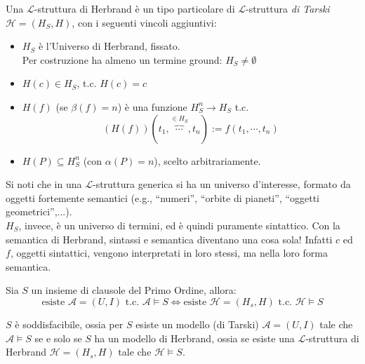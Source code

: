\begin{defi}
  Una $\mathscr{L}$-struttura di Herbrand è un tipo particolare di $\mathscr{L}$-struttura \textit{di Tarski} $\mathscr{H} = (H_S, H)$, con i seguenti vincoli aggiuntivi: 
  \begin{itemize}
    \item $H_S$ è l'Universo di Herbrand, fissato. \\
    Per costruzione ha almeno un termine ground: $H_S \neq \emptyset$
    \item $H(c) \in H_S$, t.c. $H(c) = c$
    \item $H(f)$ (se $\beta(f) = n$) è una funzione $H_S^n \rightarrow H_S$ t.c.
    $$
    (H(f))(t_1, \overbrace{\cdots}^{\in H_S}, t_n) := f(t_1, \cdots, t_n)
    $$
    \item $H(P) \subseteq H_S^n$ (con $\alpha(P) = n$), scelto arbitrariamente.
  \end{itemize}
\end{defi}
Si noti che in una $\mathscr{L}$-struttura generica si ha un universo d'interesse, formato da oggetti fortemente semantici (e.g., ``numeri'', ``orbite di pianeti'', ``oggetti geometrici'',...). \\
$H_S$, invece, è un universo di termini, ed è quindi puramente sintattico. Con la semantica di Herbrand, sintassi e semantica diventano una cosa sola! Infatti $c$ ed $f$, oggetti sintattici, vengono interpretati in loro stessi, ma nella loro forma semantica.

\begin{teon}
\label{thm:fondamentale-herbrand}
  Sia $S$ un insieme di clausole del Primo Ordine, allora:
  $$
  \text{esiste } \mathscr{A} = (U,I) \text{ t.c. } \mathscr{A} \models S \iff
  \text{esiste } \mathscr{H}=(H_s, H) \text{ t.c. } \mathscr{H} \models S
  $$
\end{teon}
\noindent
$S$ è soddisfacibile, ossia per $S$ esiste un modello (di Tarski) $\mathscr{A} = (U,I)$ tale che $\mathscr{A} \models S$ se e solo se $S$ ha un modello di Herbrand, ossia se esiste una $\mathscr{L}$-struttura di Herbrand $\mathscr{H}=(H_s, H)$ tale che $\mathscr{H} \models S$.

